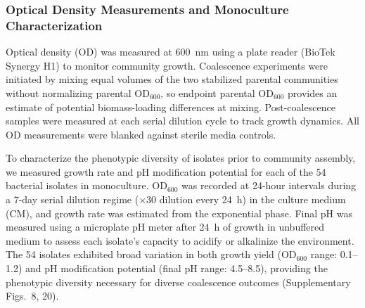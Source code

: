 \subsubsection*{Optical Density Measurements and Monoculture Characterization}
\label{sec:suppl:od}

Optical density (OD) was measured at 600~nm using a plate reader (BioTek Synergy H1) to monitor community growth. Coalescence experiments were initiated by mixing equal volumes of the two stabilized parental communities without normalizing parental OD$_{600}$, so endpoint parental OD$_{600}$ provides an estimate of potential biomass-loading differences at mixing. Post-coalescence samples were measured at each serial dilution cycle to track growth dynamics. All OD measurements were blanked against sterile media controls.

To characterize the phenotypic diversity of isolates prior to community assembly, we measured growth rate and pH modification potential for each of the 54 bacterial isolates in monoculture. OD$_{600}$ was recorded at 24-hour intervals during a 7-day serial dilution regime ($\times$30 dilution every 24~h) in the culture medium (CM), and growth rate was estimated from the exponential phase. Final pH was measured using a microplate pH meter after 24~h of growth in unbuffered medium to assess each isolate's capacity to acidify or alkalinize the environment.  The 54 isolates exhibited broad variation in both growth yield (OD$_{600}$ range: 0.1--1.2) and pH modification potential (final pH range: 4.5--8.5), providing the phenotypic diversity necessary for diverse coalescence outcomes (Supplementary Figs.~8, 20).
